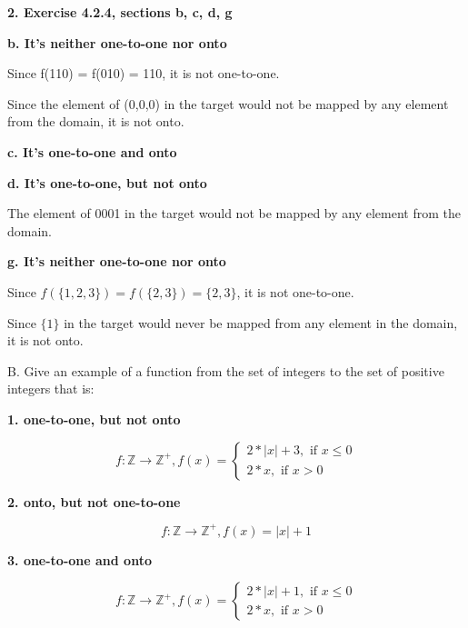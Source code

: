 \documentclass[11pt]{article}
\begin{document}
	\vspace{10mm}
	\textbf{2. Exercise 4.2.4, sections b, c, d, g}
	
	\textbf{b. It's neither one-to-one nor onto}
	
	Since f(110) = f(010) = 110, it is not one-to-one. 
	
	Since the element of (0,0,0) in the target would not be mapped by any element from the domain, it is not onto.
	
	\textbf{c. It's one-to-one and onto}
	
	\textbf{d. It's one-to-one, but not onto}
	
	The element of 0001 in the target would not be mapped by any element from the domain.
	
	\textbf{g. It's neither one-to-one nor onto}
	
	Since $f(\{1,2,3\})=f(\{2,3\})=\{2,3\}$, it is not one-to-one.
	
	Since $\{1\}$ in the target would never be mapped from any element in the domain, it is not onto.
	
	\vspace{10mm}
	B. Give an example of a function from the set of integers to the set of positive integers that is:
	
	\textbf{1. one-to-one, but not onto}
	
    \begin{equation*}
    f\colon\mathbb{Z}\rightarrow\mathbb{Z^+}, f(x) = 
    \begin{cases}
    2*|x| + 3, \text{ if } x\leq 0\\
    2*x, \text{ if } x > 0
    \end{cases}
    \end{equation*}
	
	\textbf{2. onto, but not one-to-one}
	
	\begin{equation*}
	    f\colon\mathbb{Z}\rightarrow\mathbb{Z^+}, f(x) = |x| + 1
	\end{equation*}
	
	\textbf{3. one-to-one and onto}
	
	\begin{equation*}
	    f\colon\mathbb{Z}\rightarrow\mathbb{Z^+}, f(x) = 
	    \begin{cases}
	        2*|x|+1, \text{ if } x\leq 0\\
	        2*x, \text{ if } x > 0
	    \end{cases}
	\end{equation*}
	
\end{document}
